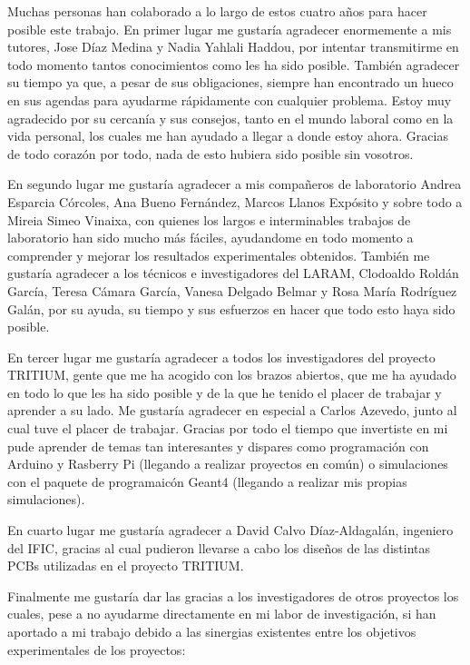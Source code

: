 Muchas personas han colaborado a lo largo de estos cuatro años para hacer posible este trabajo. En primer lugar me gustaría agradecer enormemente a mis tutores, Jose Díaz Medina y Nadia Yahlali Haddou, por intentar transmitirme en todo momento tantos conocimientos como les ha sido posible. También agradecer su tiempo ya que, a pesar de sus obligaciones, siempre han encontrado un hueco en sus agendas para ayudarme rápidamente con cualquier problema. Estoy muy agradecido por su cercanía y sus consejos, tanto en el mundo laboral como en la vida personal, los cuales me han ayudado a llegar a donde estoy ahora. Gracias de todo corazón por todo, nada de esto hubiera sido posible sin vosotros.

En segundo lugar me gustaría agradecer a mis compañeros de laboratorio Andrea Esparcia Córcoles, Ana Bueno Fernández, Marcos Llanos Expósito y sobre todo a Mireia Simeo Vinaixa, con quienes los largos e interminables trabajos de laboratorio han sido mucho más fáciles, ayudandome en todo momento a comprender y mejorar los resultados experimentales obtenidos.  También me gustaría agradecer a los técnicos e investigadores del LARAM, Clodoaldo Roldán García, Teresa Cámara García, Vanesa Delgado Belmar y Rosa María Rodríguez Galán, por su ayuda, su tiempo y sus esfuerzos en hacer que todo esto haya sido posible.

En tercer lugar me gustaría agradecer a todos los investigadores del proyecto TRITIUM, gente que me ha acogido con los brazos abiertos, que me ha ayudado en todo lo que les ha sido posible y de la que he tenido el placer de trabajar y aprender a su lado. Me gustaría agradecer en especial a Carlos Azevedo, junto al cual tuve el placer de trabajar. Gracias por todo el tiempo que invertiste en mi pude aprender de temas tan interesantes y dispares como programación con Arduino y Rasberry Pi (llegando a realizar proyectos en común) o simulaciones con el paquete de programaicón Geant4 (llegando a realizar mis propias simulaciones).

En cuarto lugar me gustaría agradecer a David Calvo Díaz-Aldagalán, ingeniero del IFIC, gracias al cual pudieron llevarse a cabo los diseños de las distintas PCBs utilizadas en el proyecto TRITIUM.

Finalmente me gustaría dar las gracias a los investigadores de otros proyectos los cuales, pese a no ayudarme directamente en mi labor de investigación, si han aportado a mi trabajo debido a las sinergias existentes entre los objetivos experimentales de los proyectos:

